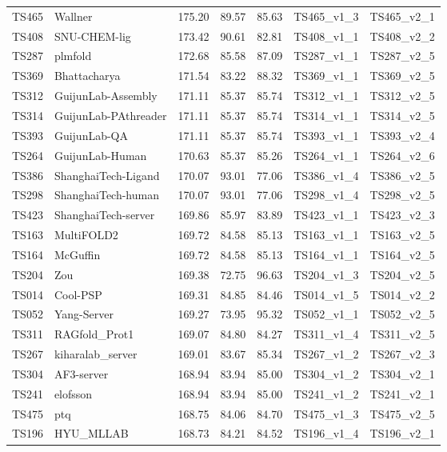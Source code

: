 \begin{longtable}{lllllll}
TS465 & Wallner & 175.20 & 89.57 & 85.63 & TS465\_v1\_3 & TS465\_v2\_1 \\ 
TS408 & SNU-CHEM-lig & 173.42 & 90.61 & 82.81 & TS408\_v1\_1 & TS408\_v2\_2 \\ 
TS287 & plmfold & 172.68 & 85.58 & 87.09 & TS287\_v1\_1 & TS287\_v2\_5 \\ 
TS369 & Bhattacharya & 171.54 & 83.22 & 88.32 & TS369\_v1\_1 & TS369\_v2\_5 \\ 
TS312 & GuijunLab-Assembly & 171.11 & 85.37 & 85.74 & TS312\_v1\_1 & TS312\_v2\_5 \\ 
TS314 & GuijunLab-PAthreader & 171.11 & 85.37 & 85.74 & TS314\_v1\_1 & TS314\_v2\_5 \\ 
TS393 & GuijunLab-QA & 171.11 & 85.37 & 85.74 & TS393\_v1\_1 & TS393\_v2\_4 \\ 
TS264 & GuijunLab-Human & 170.63 & 85.37 & 85.26 & TS264\_v1\_1 & TS264\_v2\_6 \\ 
TS386 & ShanghaiTech-Ligand & 170.07 & 93.01 & 77.06 & TS386\_v1\_4 & TS386\_v2\_5 \\ 
TS298 & ShanghaiTech-human & 170.07 & 93.01 & 77.06 & TS298\_v1\_4 & TS298\_v2\_5 \\ 
TS423 & ShanghaiTech-server & 169.86 & 85.97 & 83.89 & TS423\_v1\_1 & TS423\_v2\_3 \\ 
TS163 & MultiFOLD2 & 169.72 & 84.58 & 85.13 & TS163\_v1\_1 & TS163\_v2\_5 \\ 
TS164 & McGuffin & 169.72 & 84.58 & 85.13 & TS164\_v1\_1 & TS164\_v2\_5 \\ 
TS204 & Zou & 169.38 & 72.75 & 96.63 & TS204\_v1\_3 & TS204\_v2\_5 \\ 
TS014 & Cool-PSP & 169.31 & 84.85 & 84.46 & TS014\_v1\_5 & TS014\_v2\_2 \\ 
TS052 & Yang-Server & 169.27 & 73.95 & 95.32 & TS052\_v1\_1 & TS052\_v2\_5 \\ 
TS311 & RAGfold\_Prot1 & 169.07 & 84.80 & 84.27 & TS311\_v1\_4 & TS311\_v2\_5 \\ 
TS267 & kiharalab\_server & 169.01 & 83.67 & 85.34 & TS267\_v1\_2 & TS267\_v2\_3 \\ 
TS304 & AF3-server & 168.94 & 83.94 & 85.00 & TS304\_v1\_2 & TS304\_v2\_1 \\ 
TS241 & elofsson & 168.94 & 83.94 & 85.00 & TS241\_v1\_2 & TS241\_v2\_1 \\ 
TS475 & ptq & 168.75 & 84.06 & 84.70 & TS475\_v1\_3 & TS475\_v2\_5 \\ 
TS196 & HYU\_MLLAB & 168.73 & 84.21 & 84.52 & TS196\_v1\_4 & TS196\_v2\_1 \\ 

\end{longtable}

